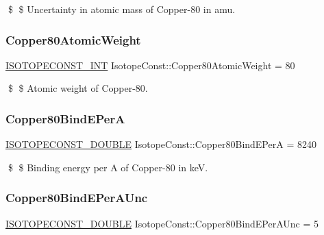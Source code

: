 \$ \$ Uncertainty in atomic mass of Copper-\/80 in amu. \mbox{\label{group___isotope_const-_copper-_cu80_gabd691bac52477a4f6455798f7516e889}} 
\subsubsection{\texorpdfstring{Copper80\+Atomic\+Weight}{Copper80AtomicWeight}}
{\footnotesize\ttfamily \mbox{\hyperlink{group___isotope_const-_macros_ga5f18360b3e99483a35c32d789e62621c}{I\+S\+O\+T\+O\+P\+E\+C\+O\+N\+S\+T\+\_\+\+I\+NT}} Isotope\+Const\+::\+Copper80\+Atomic\+Weight = 80}

\$ \$ Atomic weight of Copper-\/80. \mbox{\label{group___isotope_const-_copper-_cu80_gab58ed520e9c3a1ea804e4edec1132379}} 
\subsubsection{\texorpdfstring{Copper80\+Bind\+E\+PerA}{Copper80BindEPerA}}
{\footnotesize\ttfamily \mbox{\hyperlink{group___isotope_const-_macros_ga8f45a7272ce02c0b4c65c44636ed719a}{I\+S\+O\+T\+O\+P\+E\+C\+O\+N\+S\+T\+\_\+\+D\+O\+U\+B\+LE}} Isotope\+Const\+::\+Copper80\+Bind\+E\+PerA = 8240}

\$ \$ Binding energy per A of Copper-\/80 in keV. \mbox{\label{group___isotope_const-_copper-_cu80_gab8826c8cac98529ba1f145905dd0b1dc}} 
\subsubsection{\texorpdfstring{Copper80\+Bind\+E\+Per\+A\+Unc}{Copper80BindEPerAUnc}}
{\footnotesize\ttfamily \mbox{\hyperlink{group___isotope_const-_macros_ga8f45a7272ce02c0b4c65c44636ed719a}{I\+S\+O\+T\+O\+P\+E\+C\+O\+N\+S\+T\+\_\+\+D\+O\+U\+B\+LE}} Isotope\+Const\+::\+Copper80\+Bind\+E\+Per\+A\+Unc = 5}

